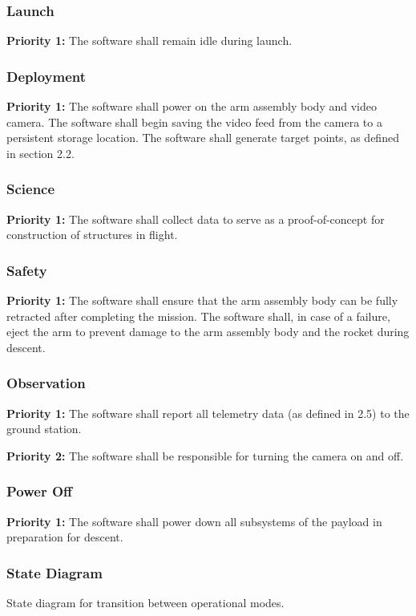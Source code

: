 \documentclass[letterpaper,10pt]{article}
\begin{document}
\subsubsection{Launch}
\textbf{Priority 1:}
The software shall remain idle during launch.

\subsubsection{Deployment}
\textbf{Priority 1:}
The software shall power on the arm assembly body and video camera.
The software shall begin saving the video feed from the camera to a persistent storage location.
The software shall generate target points, as defined in section 2.2.

\subsubsection{Science}
\textbf{Priority 1:}
The software shall collect data to serve as a proof-of-concept for construction of structures in flight.

\subsubsection{Safety}
\textbf{Priority 1:}
The software shall ensure that the arm assembly body can be fully retracted after completing the mission.
The software shall, in case of a failure, eject the arm to prevent damage to the arm assembly body and the rocket during descent.

\subsubsection{Observation}
\textbf{Priority 1:}
The software shall report all telemetry data (as defined in 2.5) to the ground station.

\textbf{Priority 2:}
The software shall be responsible for turning the camera on and off.

\subsubsection{Power Off}
\textbf{Priority 1:}
The software shall power down all subsystems of the payload in preparation for descent.

\subsubsection{State Diagram}

\begin{center}
State diagram for transition between operational modes.
\end{center}
\end{document}
